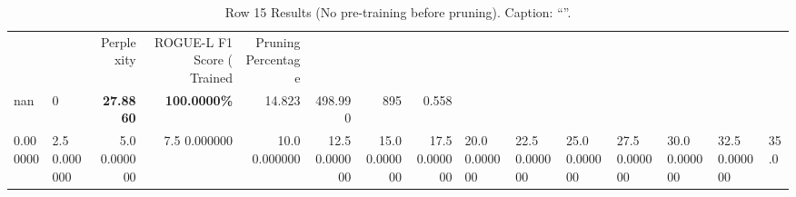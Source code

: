 \begin{table}
\caption{Row 15 Results (No pre-training before pruning). \ifshowcaption{}Caption: ``''.\fi}
\label{tab:evaluation-pipeline-15-untrained}
\begin{tabular}{llrrrrrr}
 &  & Perplexity & ROGUE-L F1 Score (%
Trained & Pruning Percentage &  &  &  &  &  &  \\
nan & 0 & \bfseries 27.8860 & \bfseries 100.0000\% & 14.823 & 498.990 & 895 & 0.558 \\
0.000000 & 2.5%
0.000000 & 5.0%
0.000000 & 7.5%
0.000000 & 10.0%
0.000000 & 12.5%
0.000000 & 15.0%
0.000000 & 17.5%
0.000000 & 20.0%
0.000000 & 22.5%
0.000000 & 25.0%
0.000000 & 27.5%
0.000000 & 30.0%
0.000000 & 32.5%
0.000000 & 35.0%

\end{tabular}
\end{table}
